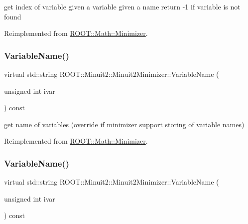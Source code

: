 get index of variable given a variable given a name return -\/1 if variable is not found 

Reimplemented from \mbox{\hyperlink{classROOT_1_1Math_1_1Minimizer_a5f7ff3bdda1f4b1d9e5e1150091a86c5}{R\+O\+O\+T\+::\+Math\+::\+Minimizer}}.

\mbox{\label{classROOT_1_1Minuit2_1_1Minuit2Minimizer_a8f5a6dc65fdfeb0351039d80f7c94968}} 
\subsubsection{\texorpdfstring{VariableName()}{VariableName()}\hspace{0.1cm}{\footnotesize\ttfamily [1/2]}}
{\footnotesize\ttfamily virtual std\+::string R\+O\+O\+T\+::\+Minuit2\+::\+Minuit2\+Minimizer\+::\+Variable\+Name (\begin{DoxyParamCaption}\item[{unsigned int}]{ivar }\end{DoxyParamCaption}) const\hspace{0.3cm}{\ttfamily [virtual]}}



get name of variables (override if minimizer support storing of variable names) 



Reimplemented from \mbox{\hyperlink{classROOT_1_1Math_1_1Minimizer_a4d6a3c9c95608b35a25f16afd50690ad}{R\+O\+O\+T\+::\+Math\+::\+Minimizer}}.

\mbox{\label{classROOT_1_1Minuit2_1_1Minuit2Minimizer_a8f5a6dc65fdfeb0351039d80f7c94968}} 
\subsubsection{\texorpdfstring{VariableName()}{VariableName()}\hspace{0.1cm}{\footnotesize\ttfamily [2/2]}}
{\footnotesize\ttfamily virtual std\+::string R\+O\+O\+T\+::\+Minuit2\+::\+Minuit2\+Minimizer\+::\+Variable\+Name (\begin{DoxyParamCaption}\item[{unsigned int}]{ivar }\end{DoxyParamCaption}) const\hspace{0.3cm}{\ttfamily [virtual]}}



